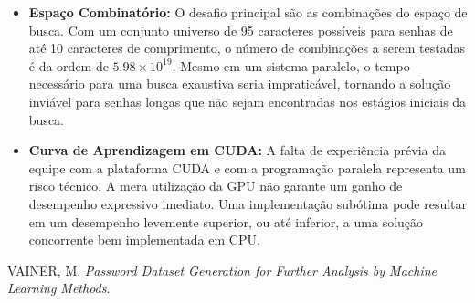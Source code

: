 \documentclass[12pt, a4paper]{article}
\begin{document}
\begin{itemize}
    \item \textbf{Espaço Combinatório:} O desafio principal são as combinações do espaço de busca. Com um conjunto universo de 95 caracteres possíveis para senhas de até 10 caracteres de comprimento, o número de combinações a serem testadas é da ordem de $5.98 \times 10^{19}$. Mesmo em um sistema paralelo, o tempo necessário para uma busca exaustiva seria impraticável, tornando a solução inviável para senhas longas que não sejam encontradas nos estágios iniciais da busca.

    \item \textbf{Curva de Aprendizagem em CUDA:} A falta de experiência prévia da equipe com a plataforma CUDA e com a programação paralela representa um risco técnico. A mera utilização da GPU não garante um ganho de desempenho expressivo imediato. Uma implementação subótima pode resultar em um desempenho levemente superior, ou até inferior, a uma solução concorrente bem implementada em CPU.
\end{itemize}


\begin{thebibliography}{9}
    VAINER, M. \textit{Password Dataset Generation for Further Analysis by Machine Learning Methods}.


\end{thebibliography}
\end{document}
